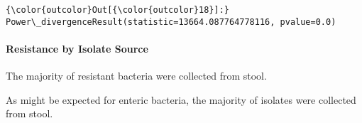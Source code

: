 \documentclass[11pt]{article}
\begin{document}
\begin{Verbatim}[commandchars=\\\{\}]
{\color{outcolor}Out[{\color{outcolor}18}]:} Power\_divergenceResult(statistic=13664.087764778116, pvalue=0.0)
\end{Verbatim}
            
    \hypertarget{resistance-by-isolate-source}{%
\paragraph{Resistance by Isolate
Source}\label{resistance-by-isolate-source}}

    The majority of resistant bacteria were collected from stool.

As might be expected for enteric bacteria, the majority of isolates were
collected from stool.
\end{document}
